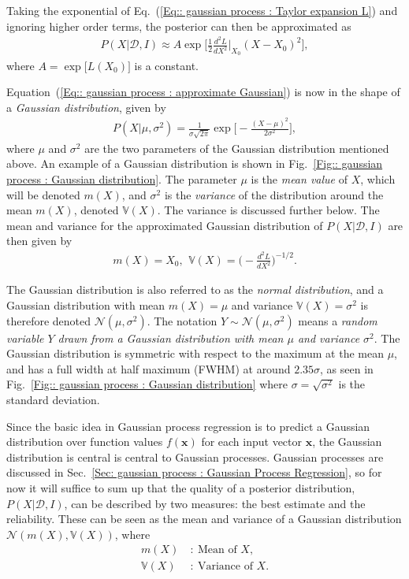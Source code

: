 \documentclass[twoside,english]{uiofysmaster}
\begin{document}
{Taking the exponential of Eq.~(\ref{Eq:: gaussian process : Taylor expansion L}) and ignoring higher order terms, the posterior can then be approximated as
\begin{align}\label{Eq:: gaussian process : approximate Gaussian}
P(X | \mathcal{D}, I) \approx A \exp \Bigg[ \frac{1}{2} \frac{d^2L}{dX^2}\Big|_{X_0} (X-X_0)^2 \Bigg], 
\end{align} 
where $A = \exp \big[L(X_0) \big]$ is a constant. 

Equation~(\ref{Eq:: gaussian process : approximate Gaussian}) is now in the shape of a \textit{Gaussian distribution}, given by
\begin{align}
P(X| \mu, \sigma^2) = \frac{1}{\sigma \sqrt{2 \pi}} \exp \Bigg[ - \frac{(X- \mu)^2}{2 \sigma^2} \Bigg],
\end{align}
where $\mu$ and $\sigma^2$ are the two parameters of the Gaussian distribution mentioned above. An example of a Gaussian distribution is shown in Fig.~\ref{Fig:: gaussian process : Gaussian distribution}. The parameter $\mu$ is the \textit{mean value} of $X$, which will be denoted $ m(X)$, and $\sigma^2$ is the \textit{variance} of the distribution around the mean $m(X)$, denoted $\mathbb{V}(X)$. The variance is discussed further below. The mean and variance for the approximated Gaussian distribution of $P(X|\mathcal{D}, I)$ are then given by
\begin{align}
m(X) = X_0\text{, }~ \mathbb{V}(X) = \Big( - \frac{d^2L}{dX^2} \Big)^{-1/2}.
\end{align}

The Gaussian distribution is also referred to as the \textit{normal distribution}, and a Gaussian distribution with mean $m(X)= \mu$ and variance $\mathbb{V}(X)=\sigma^2$ is therefore denoted $\mathcal{N}(\mu, \sigma^2)$. The notation $Y \sim \mathcal{N}(\mu, \sigma^2)$ means a \textit{random variable $Y$ drawn from a Gaussian distribution with mean $\mu$ and variance $\sigma^2$}. The Gaussian distribution is symmetric with respect to the maximum at the mean $\mu$, and has a full width at half maximum (FWHM) at around $2.35 \sigma$, as seen in Fig.~\ref{Fig:: gaussian process : Gaussian distribution} where $\sigma = \sqrt{\sigma^2}$ is the standard deviation.  

Since the basic idea in Gaussian process regression is to predict a Gaussian distribution over function values $f(\textbf{x})$ for each input vector $\textbf{x}$, the Gaussian distribution is central is central to Gaussian processes. Gaussian processes are discussed in Sec.~\ref{Sec: gaussian process : Gaussian Process Regression}, so for now it will suffice to sum up that the quality of a posterior distribution, $P(X| \mathcal{D}, I)$, can be described by two measures: the best estimate and the reliability. These can be seen as the mean and variance of a Gaussian distribution $\mathcal{N}(m(X), \mathbb{V}(X))$, where
\begin{align}
m(X)~&:~ \text{Mean of }X,\\
\mathbb{V}(X)~&:~ \text{Variance of }X.
\end{align}


}
\end{document}
